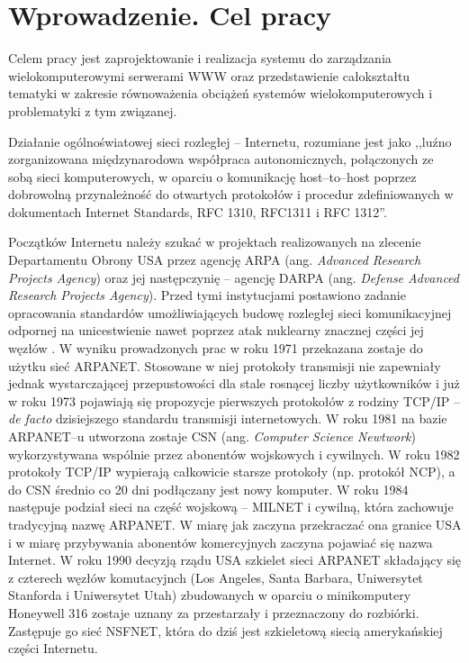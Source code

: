 \chapter{Wprowadzenie. Cel pracy}
\label{r01}
Celem pracy jest zaprojektowanie i realizacja systemu do zarządzania wielokomputerowymi
serwerami WWW oraz przedstawienie całokształtu tematyki w zakresie równoważenia obciążeń 
systemów wielokomputerowych i problematyki z tym związanej.

Działanie ogólnoświatowej sieci rozległej -- Internetu, rozumiane jest jako ,,luźno zorganizowana 
międzynarodowa współpraca autonomicznych, połączonych ze sobą sieci komputerowych, w oparciu o komunikację 
host--to--host poprzez dobrowolną przynależność do otwartych protokołów i procedur zdefiniowanych w dokumentach 
Internet Standards, RFC 1310, RFC1311 i  RFC 1312''. 

Początków Internetu należy szukać w projektach realizowanych na zlecenie Departamentu Obrony USA przez agencję 
ARPA (ang. \emph{Advanced Research Projects Agency}) oraz jej następczynię -- agencję DARPA (ang. \emph{Defense Advanced 
Research Projects Agency}). Przed tymi instytucjami postawiono zadanie opracowania standardów umożliwiających 
budowę rozległej sieci komunikacyjnej odpornej na unicestwienie nawet poprzez atak nuklearny znacznej części 
jej węzłów \cite{barylo1}. W wyniku prowadzonych prac w roku 1971 przekazana zostaje do użytku sieć ARPANET. Stosowane w niej 
protokoły transmisji nie zapewniały jednak wystarczającej przepustowości dla stale rosnącej liczby użytkowników
i już w roku 1973 pojawiają się propozycje pierwszych protokołów z rodziny TCP/IP -- \emph{de facto} dzisiejszego
standardu transmisji internetowych. W roku 1981 na bazie ARPANET--u utworzona zostaje CSN (ang. \emph{Computer Science 
Newtwork})  wykorzystywana wspólnie przez abonentów wojskowych i cywilnych. W roku 1982 
protokoły TCP/IP wypierają całkowicie starsze protokoły (np. protokół NCP),  a do CSN średnio co 20 dni 
podłączany jest nowy komputer. W roku 1984 następuje podział sieci na część wojskową -- MILNET i cywilną, 
która zachowuje tradycyjną nazwę ARPANET. W miarę jak zaczyna przekraczać ona granice USA i w miarę przybywania 
abonentów komercyjnych zaczyna pojawiać się nazwa Internet. W roku 1990 decyzją rządu USA szkielet sieci ARPANET 
składający się z  czterech węzłów komutacyjnch (Los Angeles, Santa Barbara, Uniwersytet Stanforda i Uniwersytet 
Utah) zbudowanych w oparciu o minikomputery Honeywell 316 zostaje uznany za przestarzały i przeznaczony do 
rozbiórki. Zastępuje go sieć NSFNET, która do dziś jest szkieletową siecią amerykańskiej części Internetu.

